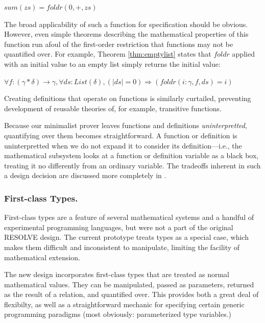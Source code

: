 $sum(zs) = foldr(0, +, zs)$

The broad applicability of such a function for specification should be obvious.  However, even simple theorems describing the mathematical properties of this function run afoul of the first-order restriction that functions may not be quantified over.  For example, Theorem \ref{thm:emptylist} states that $foldr$ applied with an initial value to an empty list simply returns the initial value:

\begin{thm}
$\forall f : (\gamma*\delta)\rightarrow\gamma, \forall ds : List(\delta), (|ds| = 0) \Rightarrow (foldr(i : \gamma, f, ds) = i)$
\label{thm:emptylist}
\end{thm}

Creating definitions that operate on functions is similarly curtailed, preventing development of reusable theories of, for example, transitive functions.

Because our minimalist prover leaves functions and definitions \emph{uninterpretted}, quantifying over them becomes straightforward.  A function or definition is uninterpretted when we do not expand it to consider its definition---i.e., the mathematical subsystem looks at a function or definition variable as a black box, treating it no differently from an ordinary variable.  The tradeoffs inherent in such a design decision are discussed more completely in \cite{tagoreExpand}.

\subsubsection{First-class Types.}\label{sec:firstClassTypes}
First-class types are a feature of several mathematical systems and a handful of experimental programming languages, but were not a part of the original RESOLVE design.  The current prototype treats types as a special case, which makes them difficult and inconsistent to manipulate, limiting the facility of mathematical extension.

The new design incorporates first-class types that are treated as normal mathematical values.  They can be manipulated, passed as parameters, returned as the result of a relation, and quantified over.  This provides both a great deal of flexibilty, as well as a straightforward mechanic for specifying certain generic programming paradigms (most obviously: parameterized type variables.)


